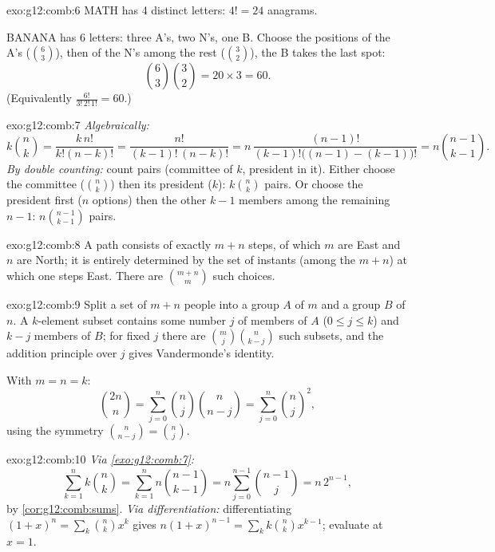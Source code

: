 \begin{solution}{exo:g12:comb:6}
MATH has 4 distinct letters: $4! = 24$ anagrams.

BANANA has 6 letters: three A's, two N's, one B. Choose the positions of the
A's ($\binom63$), then of the N's among the rest ($\binom32$), the B takes
the last spot:
\[
\binom{6}{3}\binom{3}{2} = 20 \times 3 = 60 .
\]
(Equivalently $\frac{6!}{3!\,2!\,1!} = 60$.)
\end{solution}

\begin{solution}{exo:g12:comb:7}
\emph{Algebraically:}
\[
k\binom nk = \frac{k\,n!}{k!(n-k)!} = \frac{n!}{(k-1)!\,(n-k)!}
= n\,\frac{(n-1)!}{(k-1)!\bigl((n-1)-(k-1)\bigr)!} = n\binom{n-1}{k-1}.
\]
\emph{By double counting:} count pairs (committee of $k$, president in it).
Either choose the committee ($\binom nk$) then its president ($k$):
$k\binom nk$ pairs. Or choose the president first ($n$ options) then the
other $k-1$ members among the remaining $n-1$: $n\binom{n-1}{k-1}$ pairs.
\end{solution}

\begin{solution}{exo:g12:comb:8}
A path consists of exactly $m + n$ steps, of which $m$ are East and $n$ are
North; it is entirely determined by the set of instants (among the $m+n$) at
which one steps East. There are $\binom{m+n}{m}$ such choices.
\end{solution}

\begin{solution}{exo:g12:comb:9}
Split a set of $m + n$ people into a group $A$ of $m$ and a group $B$ of
$n$. A $k$-element subset contains some number $j$ of members of $A$
($0 \leq j \leq k$) and $k - j$ members of $B$; for fixed $j$ there are
$\binom mj \binom{n}{k-j}$ such subsets, and the addition principle over $j$
gives Vandermonde's identity.

With $m = n = k$:
\[
\binom{2n}{n} = \sum_{j=0}^n \binom nj \binom{n}{n-j}
= \sum_{j=0}^n \binom nj^{2},
\]
using the symmetry $\binom{n}{n-j} = \binom nj$.
\end{solution}

\begin{solution}{exo:g12:comb:10}
\emph{Via \cref{exo:g12:comb:7}:}
\[
\sum_{k=1}^n k\binom nk = \sum_{k=1}^n n\binom{n-1}{k-1}
= n\sum_{j=0}^{n-1}\binom{n-1}{j} = n\,2^{n-1},
\]
by \cref{cor:g12:comb:sums}. \emph{Via differentiation:} differentiating
$(1+x)^n = \sum_k \binom nk x^k$ gives
$n(1+x)^{n-1} = \sum_k k \binom nk x^{k-1}$; evaluate at $x = 1$.
\end{solution}

